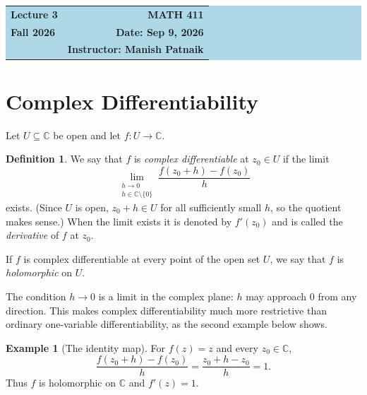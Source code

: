 \documentclass[11pt]{article}
\theoremstyle{plain}
\theoremstyle{definition}
\newtheorem{definition}[theorem]{Definition}
\newtheorem{example}[theorem]{Example}
\theoremstyle{remark}
\numberwithin{equation}{section}
\newcommand{\be}{\begin{equation}}
\newcommand{\ee}{\end{equation}}
\newcommand{\C}{\mathbb{C}}
\begin{document}
\begin{center}
  \colorbox{lightblue}{%
    \begin{minipage}{0.94\textwidth}
      \vspace{0.55em}
      \begin{tabular*}{\textwidth}{@{\extracolsep{\fill}}lr}
        {\color{courseblue}\bfseries\LARGE Lecture 3} &
        {\color{courseblue}\bfseries\LARGE MATH 411}\\[0.35em]
        \textbf{Fall 2026} & \textbf{Date: Sep 9, 2026}\\
        & \textbf{Instructor: Manish Patnaik}
      \end{tabular*}
      \vspace{0.45em}
    \end{minipage}}
\end{center}

\tableofcontents
\vspace{0.45em}

\section{Complex Differentiability}

Let $U\subseteq\C$ be open and let $f:U\to\C$.

\begin{definition}
We say that $f$ is \emph{complex differentiable} at $z_0\in U$ if the
limit
\be
  \lim_{\substack{h\to0\\ h\in\C\setminus\{0\}}}
  \frac{f(z_0+h)-f(z_0)}{h}
\ee
exists.  (Since $U$ is open, $z_0+h\in U$ for all sufficiently small
$h$, so the quotient makes sense.)  When the limit exists it is denoted
by $f'(z_0)$ and is called the \emph{derivative} of $f$ at $z_0$.

If $f$ is complex differentiable at every point of the open set $U$, we
say that $f$ is \emph{holomorphic} on $U$.
\end{definition}

The condition $h\to0$ is a limit in the complex plane: $h$ may approach
$0$ from any direction.  This makes complex differentiability much more
restrictive than ordinary one-variable differentiability, as the second
example below shows.

\begin{example}[The identity map]
For $f(z)=z$ and every $z_0\in\C$,
\[
  \frac{f(z_0+h)-f(z_0)}{h}
  =\frac{z_0+h-z_0}{h}=1.
\]
Thus $f$ is holomorphic on $\C$ and $f'(z)=1$.
\end{example}
\end{document}
